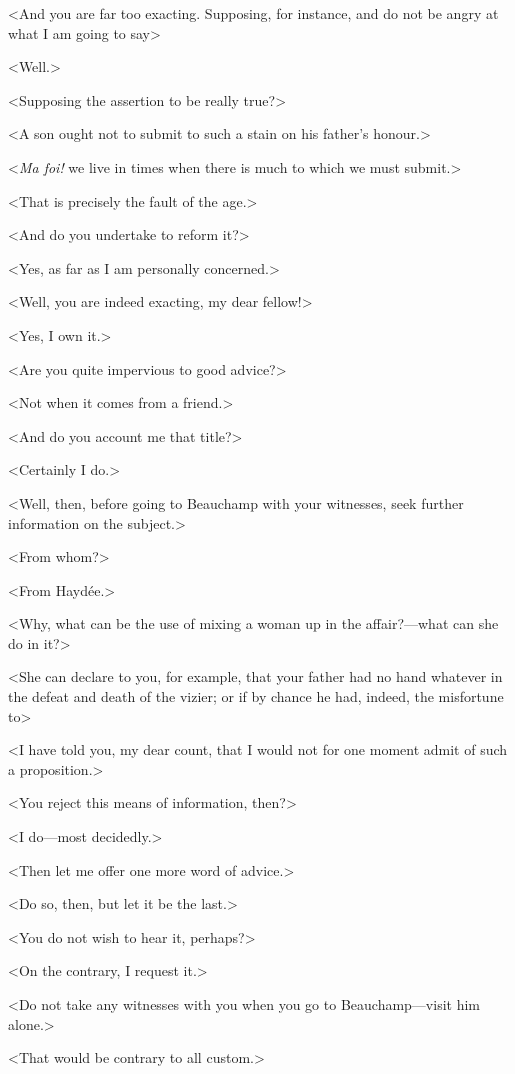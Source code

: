  <And you are far too exacting. Supposing, for instance, and do not be angry at what I am going to say\longdash> 

 <Well.> 

 <Supposing the assertion to be really true?> 

 <A son ought not to submit to such a stain on his father's honour.> 

 <\textit{Ma foi!} we live in times when there is much to which we must submit.> 

 <That is precisely the fault of the age.> 

 <And do you undertake to reform it?> 

 <Yes, as far as I am personally concerned.> 

 <Well, you are indeed exacting, my dear fellow!> 

 <Yes, I own it.> 

 <Are you quite impervious to good advice?> 

 <Not when it comes from a friend.> 

 <And do you account me that title?> 

 <Certainly I do.> 

 <Well, then, before going to Beauchamp with your witnesses, seek further information on the subject.> 

 <From whom?> 

 <From Haydée.> 

 <Why, what can be the use of mixing a woman up in the affair?—what can she do in it?> 

 <She can declare to you, for example, that your father had no hand whatever in the defeat and death of the vizier; or if by chance he had, indeed, the misfortune to\longdash> 

 <I have told you, my dear count, that I would not for one moment admit of such a proposition.> 

 <You reject this means of information, then?> 

 <I do—most decidedly.> 

 <Then let me offer one more word of advice.> 

 <Do so, then, but let it be the last.> 

 <You do not wish to hear it, perhaps?> 

 <On the contrary, I request it.> 

 <Do not take any witnesses with you when you go to Beauchamp—visit him alone.> 

 <That would be contrary to all custom.> 

